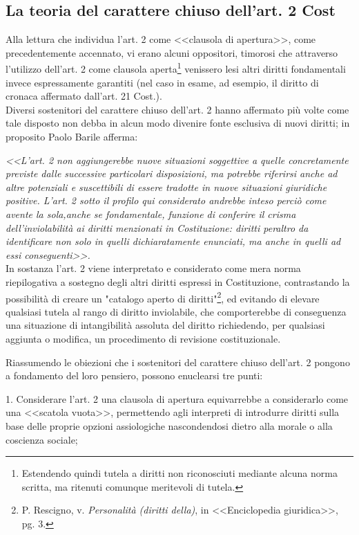 \subsection{La teoria del carattere chiuso dell'art. 2 Cost}
Alla lettura che individua l'art. 2 come <<clausola di apertura>>, come precedentemente accennato, vi erano alcuni oppositori, timorosi che attraverso l'utilizzo dell’art. 2 come clausola aperta\footnote{Estendendo quindi tutela a diritti non riconosciuti mediante alcuna norma scritta, ma ritenuti comunque meritevoli di tutela.} venissero lesi altri diritti fondamentali invece espressamente garantiti (nel caso in esame, ad esempio, il diritto di cronaca affermato dall'art. 21 Cost.).
\\Diversi sostenitori del carattere chiuso dell'art. 2 hanno affermato più volte come tale disposto non debba in alcun modo divenire fonte esclusiva di nuovi diritti; in proposito Paolo Barile afferma: 

\textit{<<L’art. 2 non aggiungerebbe nuove situazioni soggettive a quelle concretamente previste dalle successive particolari disposizioni, ma potrebbe riferirsi anche ad altre potenziali e suscettibili di essere tradotte in nuove situazioni giuridiche positive. L’art. 2 sotto il profilo qui considerato andrebbe inteso perciò come avente la sola,anche se fondamentale, funzione di conferire il crisma dell’inviolabilità ai diritti menzionati in Costituzione: diritti peraltro da identificare non solo in quelli dichiaratamente enunciati, ma anche in quelli ad essi conseguenti>>.} 
\\In sostanza l'art. 2 viene interpretato e considerato come mera norma riepilogativa a sostegno degli altri diritti espressi in Costituzione, contrastando la possibilità di creare un "catalogo aperto di diritti"\footnote{P. Rescigno, v. \textit{Personalità (diritti della)}, in <<Enciclopedia giuridica>>, pg. 3.}, ed evitando di elevare qualsiasi tutela al rango di diritto inviolabile, che comporterebbe di conseguenza una situazione di intangibilità assoluta del diritto richiedendo, per qualsiasi aggiunta o modifica, un procedimento di revisione costituzionale.

Riassumendo le obiezioni che i sostenitori del carattere chiuso dell'art. 2 pongono a fondamento del loro pensiero, possono enuclearsi tre punti:

1. Considerare l'art. 2 una clausola di apertura equivarrebbe a considerarlo come una <<scatola vuota>>, permettendo agli interpreti di introdurre diritti sulla base delle proprie opzioni assiologiche nascondendosi dietro alla morale o alla coscienza sociale;

